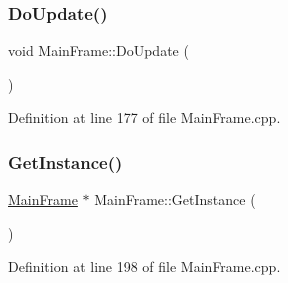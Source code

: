 \subsubsection{\texorpdfstring{Do\+Update()}{DoUpdate()}}
{\footnotesize\ttfamily void Main\+Frame\+::\+Do\+Update (\begin{DoxyParamCaption}{ }\end{DoxyParamCaption})}



Definition at line 177 of file Main\+Frame.\+cpp.

\mbox{\label{class_main_frame_a17926c75eb083f5b8249696c4cdccf55}} 
\subsubsection{\texorpdfstring{Get\+Instance()}{GetInstance()}}
{\footnotesize\ttfamily \hyperlink{class_main_frame}{Main\+Frame} $\ast$ Main\+Frame\+::\+Get\+Instance (\begin{DoxyParamCaption}{ }\end{DoxyParamCaption})\hspace{0.3cm}{\ttfamily [static]}}



Definition at line 198 of file Main\+Frame.\+cpp.

